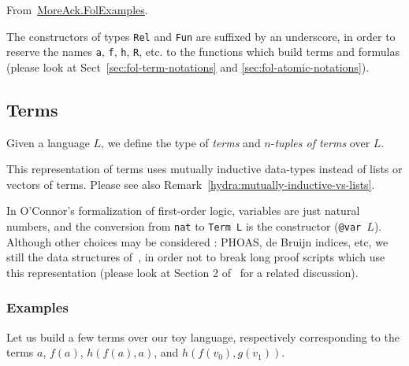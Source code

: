 From~\href{../theories/html/hydras.MoreAck.FolExamples.html}{MoreAck.FolExamples}.


\begin{remark}
  \label{rem:underscores}
  The constructors of types \texttt{Rel} and \texttt{Fun} are suffixed by an underscore, in order to reserve the names \texttt{a}, \texttt{f}, \texttt{h}, \texttt{R}, etc. to the functions which build terms and formulas (please look at Sect~\ref{sec:fol-term-notations} and \ref{sec:fol-atomic-notations}).
\end{remark}


\subsection{Terms}

Given a language $L$, we define the type of \emph{terms} and
$n$-\emph{tuples of terms} over $L$.


\begin{remark}
This representation of terms uses mutually inductive data-types instead of lists or vectors of terms. Please see also Remark~\vref{hydra:mutually-inductive-vs-lists}.
\end{remark}


\begin{remark}[Variables]
In O'Connor's formalization of first-order logic,  variables are 
just natural numbers, and the conversion from
\texttt{nat} to \texttt{Term L} is the constructor (\texttt{@var $L$}).
Although other choices may be considered : PHOAS, de Bruijn indices, etc,  we still the data structures of~\cite{Goedel}, in order not to break long proof scripts which use this representation (please look at Section 2 of~\cite{OConnor05} for a related discussion).
  
\end{remark}




\subsubsection{Examples}
\label{sect:folTermExamples}
\label{sec:fol-term-notations}

Let us build a few \gallina terms over our toy language, 
respectively corresponding to the terms $a$,
$f(a)$, $h(f(a),a)$, and $h(f(v_0),g(v_1))$.

